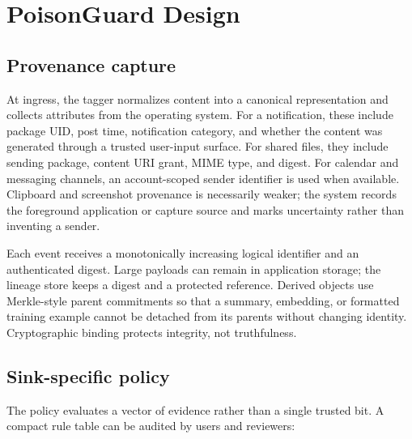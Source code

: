 \section{PoisonGuard Design}
\label{sec:method}

\subsection{Provenance capture}

At ingress, the tagger normalizes content into a canonical representation and collects attributes from the operating system. For a notification, these include package UID, post time, notification category, and whether the content was generated through a trusted user-input surface. For shared files, they include sending package, content URI grant, MIME type, and digest. For calendar and messaging channels, an account-scoped sender identifier is used when available. Clipboard and screenshot provenance is necessarily weaker; the system records the foreground application or capture source and marks uncertainty rather than inventing a sender.

Each event receives a monotonically increasing logical identifier and an authenticated digest. Large payloads can remain in application storage; the lineage store keeps a digest and a protected reference. Derived objects use Merkle-style parent commitments so that a summary, embedding, or formatted training example cannot be detached from its parents without changing identity. Cryptographic binding protects integrity, not truthfulness.

\subsection{Sink-specific policy}

The policy evaluates a vector of evidence rather than a single trusted bit. A compact rule table can be audited by users and reviewers:

\begin{table}[t]
\centering
\small
\caption{Illustrative default policy. Deployments must validate the choices; they are not empirical results.}
\label{tab:policy}
\end{table}

